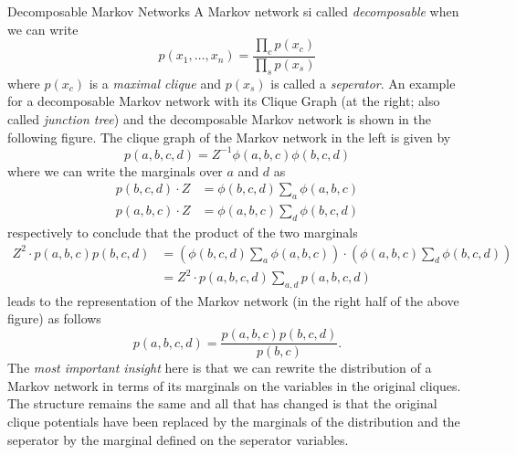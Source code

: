 \begin{topic}{.3cm}{Decomposable Markov Networks}
	A Markov network si called \emph{decomposable} when we can write %
	\begin{equation}
		p(x_1, \ldots, x_n) = \frac{\prod_c p(x_c)}{\prod_s p(x_s)}
	\end{equation}
	where \ensuremath{p(x_c)} is a \emph{maximal clique} and \ensuremath{p(x_s)} is called a \emph{seperator}. %
	An example for a decomposable Markov network with its Clique Graph (at the right; also called \emph{junction tree}) and the decomposable Markov network is shown in the following figure. %
	The clique graph of the Markov network in the left is given by %
	\begin{equation}
		p(a,b,c,d) = Z^{-1} \phi(a,b,c) \phi(b,c,d)
	\end{equation}
	where we can write the marginals over \ensuremath{a} and \ensuremath{d} as %
	\begin{align*}
		p(b,c,d) \cdot Z &= \phi(b,c,d) \sum_a \phi(a,b,c)\\
		p(a,b,c) \cdot Z &= \phi(a,b,c) \sum_d \phi(b,c,d)
	\end{align*}
	respectively to conclude that the product of the two marginals %
	\begin{align*}
		Z^2 \cdot p(a,b,c) p(b,c,d)
		&= \left( \phi(b,c,d) \sum_a \phi(a,b,c) \right) \cdot \left( \phi(a,b,c) \sum_d \phi(b,c,d) \right) \\
		&= Z^2 \cdot p(a,b,c,d) \sum_{a,d} p(a,b,c,d)
	\end{align*}%
	leads to the representation of the Markov network (in the right half of the above figure) as follows %
	\begin{equation}
		p(a,b,c,d) = \frac{p(a,b,c) p(b,c,d)}{p(b,c)}. %
	\end{equation}
	The \emph{most important insight} here is that we can rewrite the distribution of a Markov network in terms of its marginals on the variables in the original cliques. %
	The structure remains the same and all that has changed is that the original clique potentials have been replaced by the marginals of the distribution and the seperator by the marginal defined on the seperator variables. %
\end{topic}
%
%
%
